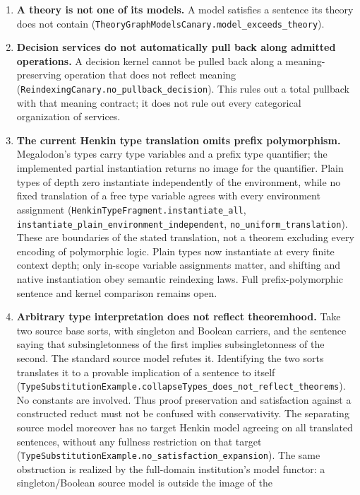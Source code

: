 \documentclass[11pt]{article}
\theoremstyle{definition}
\theoremstyle{remark}
\begin{document}
\begin{enumerate}
  exclude expansions for other arrows or under additional hypotheses.
\item \textbf{A theory is not one of its models.}  A model satisfies a
  sentence its theory does not contain
  (\nolinkurl{TheoryGraphModelsCanary.model_exceeds_theory}).
\item \textbf{Decision services do not automatically pull back along admitted operations.} A decision
  kernel cannot be pulled back along a meaning-preserving operation that
  does not reflect meaning (\nolinkurl{ReindexingCanary.no_pullback_decision}).
  This rules out a total pullback with that meaning contract; it does not
  rule out every categorical organization of services.
\item \textbf{The current Henkin type translation omits prefix polymorphism.}
  Megalodon's types carry type variables and a prefix type quantifier; the
  implemented partial instantiation returns no image for the quantifier.
  Plain types of depth zero instantiate independently of the environment,
  while no fixed translation of a free type variable agrees with every
  environment assignment
  (\nolinkurl{HenkinTypeFragment.instantiate_all},
  \nolinkurl{instantiate_plain_environment_independent},
  \nolinkurl{no_uniform_translation}). These are boundaries of the stated
  translation, not a theorem excluding every encoding of polymorphic logic.
  Plain types now instantiate at every finite context depth; only in-scope
  variable assignments matter, and shifting and native instantiation obey
  semantic reindexing laws. Full prefix-polymorphic sentence and kernel
  comparison remains open.
\item \textbf{Arbitrary type interpretation does not reflect theoremhood.}
  Take two source base sorts, with singleton and Boolean carriers, and the
  sentence saying that subsingletonness of the first implies
  subsingletonness of the second. The standard source model refutes it.
  Identifying the two sorts translates it to a provable implication of a
  sentence to itself
  (\nolinkurl{TypeSubstitutionExample.collapseTypes_does_not_reflect_theorems}).
  No constants are involved. Thus proof preservation and satisfaction
  against a constructed reduct must not be confused with conservativity.
  The separating source model moreover has no target Henkin model agreeing
  on all translated sentences, without any fullness restriction on that
  target (\nolinkurl{TypeSubstitutionExample.no_satisfaction_expansion}).
  The same obstruction is realized by the full-domain institution's model
  functor: a singleton/Boolean source model is outside the image of the

\end{enumerate}
\end{document}
